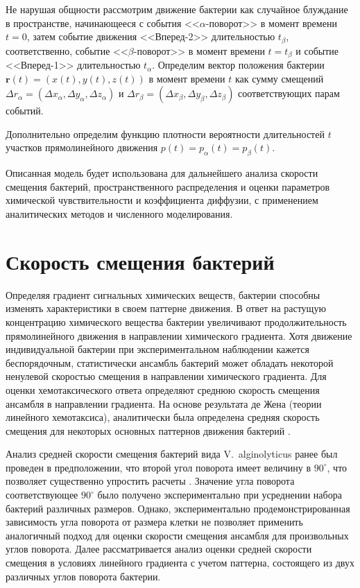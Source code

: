 Не нарушая общности рассмотрим движение бактерии как случайное блуждание в пространстве, начинающееся с события <<$\alpha$-поворот>> в момент времени $t=0$, затем событие движения <<Вперед-2>> длительностью $t_{\beta}$, соответственно, событие <<$\beta$-поворот>> в момент времени $t=t_{\beta}$ и событие <<Вперед-1>> длительностью $t_{\alpha}$. Определим вектор положения бактерии $\textbf{r}(t)=(x(t),y(t),z(t))$ в момент времени $t$ как сумму смещений $\Delta r_{\alpha}=(\Delta x_{\alpha},\Delta y_{\alpha},\Delta z_{\alpha})$ и $\Delta r_{\beta}=(\Delta x_{\beta},\Delta y_{\beta},\Delta z_{\beta})$ соответствующих парам событий. 

Дополнительно определим функцию плотности вероятности длительностей $t$ участков прямолинейного движения $p(t)=p_{\alpha}(t)=p_{\beta}(t)$. 

Описанная модель будет использована для дальнейшего анализа скорости смещения бактерий, пространственного распределения и оценки параметров химической чувствительности и коэффициента диффузии, с применением аналитических методов и численного моделирования. 

\section{Скорость смещения бактерий}\label{sec:ch2/sec3}

Определяя градиент сигнальных химических веществ, бактерии способны изменять характеристики в своем паттерне движения. В ответ на растущую концентрацию химического вещества бактерии увеличивают продолжительность прямолинейного движения в направлении химического градиента. Хотя движение индивидуальной бактерии при экспериментальном наблюдении кажется беспорядочным, статистически ансамбль бактерий может обладать некоторой ненулевой скоростью смещения в направлении химического градиента. Для оценки хемотаксического ответа определяют среднюю скорость смещения ансамбля в направлении градиента. На основе результата де Жена (теории линейного хемотаксиса), аналитически была определена средняя скорость смещения для некоторых основных паттернов движения бактерий \cite{taktikos_how_2013,de_gennes_chemotaxis_2004,locsei_persistence_2007}. 

Анализ средней скорости смещения бактерий вида V.~alginolyticus ранее был проведен в предположении, что второй угол поворота имеет величину в $90^\circ$, что позволяет существенно упростить расчеты \cite{taktikos_how_2013}. Значение угла поворота соответствующее $90^\circ$ было получено экспериментально при усреднении набора бактерий различных размеров. Однако, экспериментально продемонстрированная зависимость угла поворота от размера клетки \cite{taute_high-throughput_2015} не позволяет применить аналогичный подход для оценки скорости смещения ансамбля для произвольных углов поворота. Далее рассматривается анализ оценки средней скорости смещения в условиях линейного градиента с учетом паттерна, состоящего из двух различных углов поворота бактерии.

